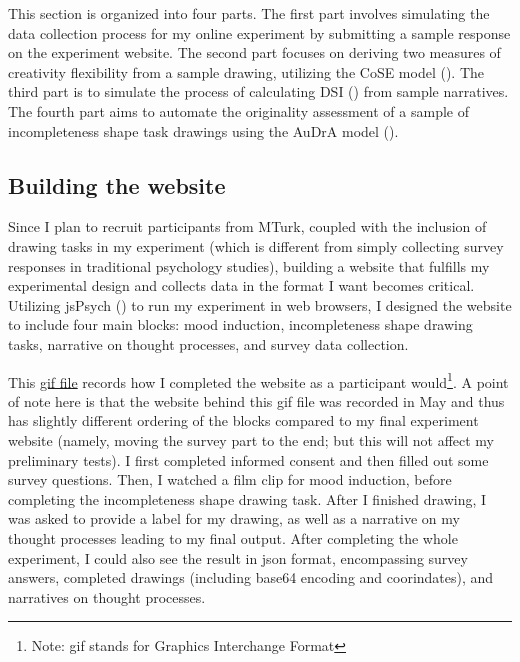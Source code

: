 \documentclass[../Proposal.tex]{subfiles}
\begin{document}
This section is organized into four parts. The first part involves simulating the data collection process for my online experiment by submitting a sample response on the experiment website. The second part focuses on deriving two measures of creativity flexibility from a sample drawing, utilizing the CoSE model (\cite{aksan_cose_2021}). The third part is to simulate the process of calculating DSI (\cite{johnson_divergent_2022}) from sample narratives. The fourth part aims to automate the originality assessment of a sample of incompleteness shape task drawings using the AuDrA model (\cite{patterson_audra_2023}). 

\subsection*{Building the website}
Since I plan to recruit participants from MTurk, coupled with the inclusion of drawing tasks in my experiment (which is different from simply collecting survey responses in traditional psychology studies), building a website that fulfills my experimental design and collects data in the format I want becomes critical. Utilizing jsPsych (\cite{leeuw_jspsych_2023}) to run my experiment in web browsers, I designed the website to include four main blocks: mood induction, incompleteness shape drawing tasks, narrative on thought processes, and survey data collection. 

This \href{https://github.com/UC-MACS-30200/course-project-cty20010831/blob/main/sample_website_response_gif/sample_response.gif}{gif file} records how I completed the website as a participant would\footnote{Note: gif stands for Graphics Interchange Format}. A point of note here is that the website behind this gif file was recorded in May and thus has slightly different ordering of the blocks compared to my final experiment website (namely, moving the survey part to the end; but this will not affect my preliminary tests). I first completed informed consent and then filled out some survey questions. Then, I watched a film clip for mood induction, before completing the incompleteness shape drawing task. After I finished drawing, I was asked to provide a label for my drawing, as well as a narrative on my thought processes leading to my final output. After completing the whole experiment, I could also see the result in json format, encompassing survey answers, completed drawings (including base64 encoding and coorindates), and narratives on thought processes.
\end{document}
